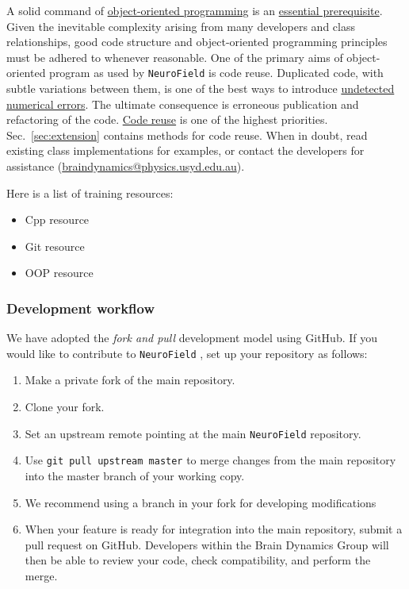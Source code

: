 \documentclass[12pt,a4paper]{article}
\newcommand{\type}[1]{{\small\small\tt #1} }
\newcommand{\NF}[0]{\type{NeuroField}}
\begin{document}
A solid command of \underline{object-oriented programming} is an \underline{essential prerequisite}. Given the inevitable complexity arising from many developers and class relationships, good code structure and object-oriented programming principles must be adhered to whenever reasonable. One of the primary aims of object-oriented program as used by \NF is code reuse. Duplicated code, with subtle variations between them, is one of the best ways to introduce \underline{undetected numerical errors}. The ultimate consequence is erroneous publication and refactoring of the code. \underline{Code reuse} is one of the highest priorities. Sec.~\ref{sec:extension} contains methods for code reuse. When in doubt, read existing class implementations for examples, or contact the developers for assistance (\url{braindynamics@physics.usyd.edu.au}).

Here is a list of training resources:

\begin{itemize}
    \item Cpp resource
    \item Git resource
    \item OOP resource
\end{itemize}

\subsubsection{Development workflow}

We have adopted the {\em fork and pull} development model using GitHub. If you would like to contribute to \NF, set up your repository as follows:

\begin{enumerate}
    \item Make a private fork of the main repository.
    \item Clone your fork.
    \item Set an upstream remote pointing at the main \NF repository.
    \item Use \type{git pull upstream master} to merge changes from the main repository into the master branch of your working copy.
    \item We recommend using a branch in your fork for developing modifications
    \item When your feature is ready for integration into the main repository, submit a pull request on GitHub. Developers within the Brain Dynamics Group will then be able to review your code, check compatibility, and perform the merge.
\end{enumerate}
\end{document}
